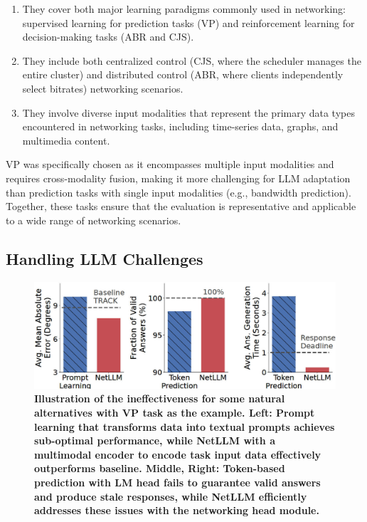 \documentclass[twocolumn]{article}
\begin{document}
\begin{enumerate}[itemsep=0pt, topsep=2pt, parsep=0pt]
  \item They cover both major learning paradigms commonly used in networking: supervised learning for prediction tasks (VP) and reinforcement learning for decision-making tasks (ABR and CJS).
  \item They include both centralized control (CJS, where the scheduler manages the entire cluster) and distributed control (ABR, where clients independently select bitrates) networking scenarios.
  \item They involve diverse input modalities that represent the primary data types encountered in networking tasks, including time-series data, graphs, and multimedia content.
\end{enumerate}

VP was specifically chosen as it encompasses multiple input modalities and requires cross-modality fusion, making it more challenging for LLM adaptation than prediction tasks with single input modalities (e.g., bandwidth prediction). Together, these tasks ensure that the evaluation is representative and applicable to a wide range of networking scenarios.

\subsection{Handling LLM Challenges}

\begin{figure}[t]
  \centering
  \includegraphics[width=1\linewidth]{img/figure2.jpg}
  \caption{\textbf{Illustration of the ineffectiveness for some natural alternatives with VP task as the example. Left: Prompt learning that transforms data into textual prompts achieves sub-optimal performance, while NetLLM with a multimodal encoder to encode task input data effectively outperforms baseline. Middle, Right: Token-based prediction with LM head fails to guarantee valid answers and produce stale responses, while NetLLM efficiently addresses these issues with the networking head module.}}
  \label{fig:2}
\end{figure}
\end{document}
